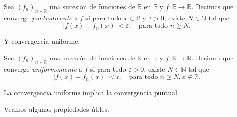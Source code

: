 \begin{definition}
	Sea $(f_n)_{n \in \mathbb{R}}$ una sucesión de funciones de $\mathbb{R}$ en $\mathbb{R}$ y $f : \mathbb{R} \to \mathbb{R}$. Decimos que converge \emph{puntualmente} a $f$ si para todo $x \in \mathbb{R}$ y $\varepsilon > 0$, existe $N \in \mathbb{N}$ tal que
	\begin{equation*}
		\left\lvert f(x) - f_n(x) \right\rvert < \varepsilon, \quad \text{para todo }n \geq N.
	\end{equation*}
\end{definition}

Y convergencia uniforme.

\begin{definition}
	Sea $(f_n)_{n \in \mathbb{R}}$ una sucesión de funciones de $\mathbb{R}$ en $\mathbb{R}$ y $f : \mathbb{R} \to \mathbb{R}$. Decimos que converge \emph{uniformemente} a $f$ si para todo $\varepsilon > 0$, existe $N \in \mathbb{N}$ tal que
	\begin{equation*}
		\left\lvert f(x) - f_n(x) \right\rvert < \varepsilon, \quad \text{para todo }n \geq N, x \in \mathbb{R}.
	\end{equation*}
\end{definition}

\begin{remark}
	La convergencia uniforme implica la convergencia puntual.
\end{remark}

Veamos algunas propiedades útiles.

